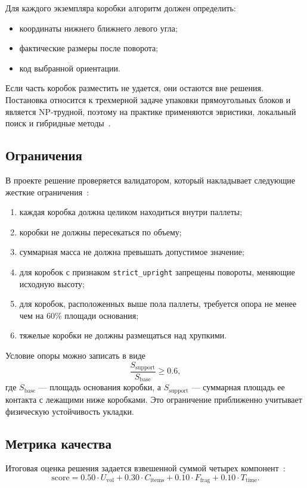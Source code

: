 \documentclass[14pt,a4paper]{extarticle}
\begin{document}
Для каждого экземпляра коробки алгоритм должен определить:
\begin{itemize}
  \item координаты нижнего ближнего левого угла;
  \item фактические размеры после поворота;
  \item код выбранной ориентации.
\end{itemize}

Если часть коробок разместить не удается, они остаются вне решения. Постановка относится к трехмерной задаче упаковки прямоугольных блоков и является NP-трудной, поэтому на практике применяются эвристики, локальный поиск и гибридные методы~\cite{martello2000,faroe2003}.

\subsection{Ограничения}

В проекте решение проверяется валидатором, который накладывает следующие жесткие ограничения~\cite{project_repo}:
\begin{enumerate}
  \item каждая коробка должна целиком находиться внутри паллеты;
  \item коробки не должны пересекаться по объему;
  \item суммарная масса не должна превышать допустимое значение;
  \item для коробок с признаком \texttt{strict\_upright} запрещены повороты, меняющие исходную высоту;
  \item для коробок, расположенных выше пола паллеты, требуется опора не менее чем на 60\% площади основания;
  \item тяжелые коробки не должны размещаться над хрупкими.
\end{enumerate}

Условие опоры можно записать в виде
\[
\frac{S_{\text{support}}}{S_{\text{base}}} \ge 0.6,
\]
где $S_{\text{base}}$ --- площадь основания коробки, а $S_{\text{support}}$ --- суммарная площадь ее контакта с лежащими ниже коробками. Это ограничение приближенно учитывает физическую устойчивость укладки.

\subsection{Метрика качества}

Итоговая оценка решения задается взвешенной суммой четырех компонент~\cite{project_repo}:
\[
\text{score} =
0.50 \cdot U_{\text{vol}} +
0.30 \cdot C_{\text{items}} +
0.10 \cdot F_{\text{frag}} +
0.10 \cdot T_{\text{time}}.
\]
\end{document}
